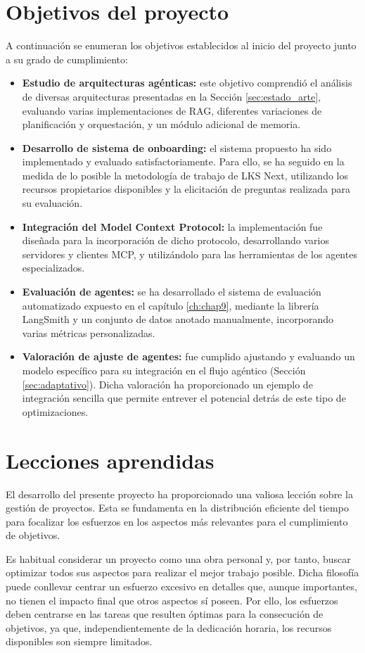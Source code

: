 \section{Objetivos del proyecto}
A continuación se enumeran los objetivos establecidos al inicio del proyecto junto a su grado de cumplimiento:
\begin{itemize}
\item\textbf{Estudio de arquitecturas agénticas: }este objetivo comprendió el análisis de diversas arquitecturas presentadas en la Sección \ref{sec:estado_arte}, evaluando varias implementaciones de RAG, diferentes variaciones de planificación y orquestación, y un módulo adicional de memoria.
\item\textbf{Desarrollo de sistema de onboarding: }el sistema propuesto ha sido implementado y evaluado satisfactoriamente. Para ello, se ha seguido en la medida de lo posible la metodología de trabajo de LKS Next, utilizando los recursos propietarios disponibles y la elicitación de preguntas realizada para su evaluación.
\item\textbf{Integración del Model Context Protocol: }la implementación fue diseñada para la incorporación de dicho protocolo, desarrollando varios servidores y clientes MCP, y utilizándolo para las herramientas de los agentes especializados.
\item\textbf{Evaluación de agentes: }se ha desarrollado el sistema de evaluación automatizado expuesto en el capítulo \ref{ch:chap9}, mediante la librería LangSmith y un conjunto de datos anotado manualmente, incorporando varias métricas personalizadas.
\item\textbf{Valoración de ajuste de agentes: }fue cumplido ajustando y evaluando un modelo específico para su integración en el flujo agéntico (Sección \ref{sec:adaptativo}). Dicha valoración ha proporcionado un ejemplo de integración sencilla que permite entrever el potencial detrás de este tipo de optimizaciones.
\end{itemize}

\section{Lecciones aprendidas}
El desarrollo del presente proyecto ha proporcionado una valiosa lección sobre la gestión de proyectos. Esta se fundamenta en la distribución eficiente del tiempo para focalizar los esfuerzos en los aspectos más relevantes para el cumplimiento de objetivos.

Es habitual considerar un proyecto como una obra personal y, por tanto, buscar optimizar todos sus aspectos para realizar el mejor trabajo posible. Dicha filosofía puede conllevar centrar un esfuerzo excesivo en detalles que, aunque importantes, no tienen el impacto final que otros aspectos sí poseen. Por ello, los esfuerzos deben centrarse en las tareas que resulten óptimas para la consecución de objetivos, ya que, independientemente de la dedicación horaria, los recursos disponibles son siempre limitados.

